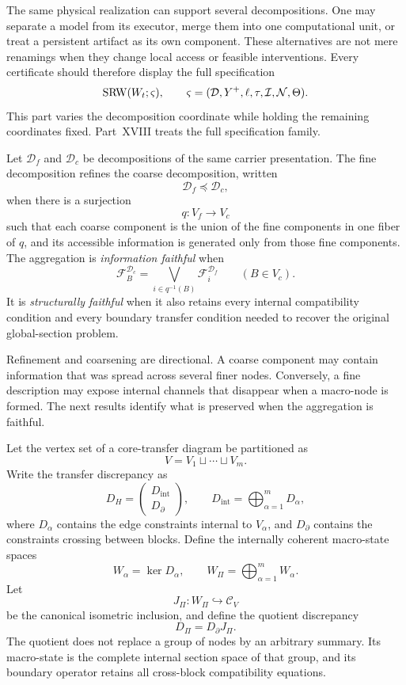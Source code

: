 The same physical realization can support several decompositions. One may
separate a model from its executor, merge them into one computational unit, or
treat a persistent artifact as its own component. These alternatives are not
mere renamings when they change local access or feasible interventions. Every certificate should therefore display the full specification
\[
\operatorname{SRW}(W_t;\varsigma),
\qquad
\varsigma=(\mathcal D,Y^+,\ell,\tau,\mathcal I,\mathcal N,\Theta).
\]
This part varies the decomposition coordinate while holding the remaining
coordinates fixed. Part~XVIII treats the full specification family.

\begin{definition}\label{def:decomposition-refinement}
Let \(\mathcal D_f\) and \(\mathcal D_c\) be decompositions of the same carrier
presentation. The fine decomposition refines the coarse decomposition,
written
\[
\mathcal D_f\preceq\mathcal D_c,
\]
when there is a surjection
\[
q:V_f\longrightarrow V_c
\]
such that each coarse component is the union of the fine components in one
fiber of \(q\), and its accessible information is generated only from those
fine components. The aggregation is \emph{information faithful} when
\[
\mathscr F_B^{\mathcal D_c}
=
\bigvee_{i\in q^{-1}(B)}
\mathscr F_i^{\mathcal D_f}
\qquad(B\in V_c).
\]
It is \emph{structurally faithful} when it also retains every internal
compatibility condition and every boundary transfer condition needed to
recover the original global-section problem.
\end{definition}

Refinement and coarsening are directional. A coarse component may contain
information that was spread across several finer nodes. Conversely, a fine
description may expose internal channels that disappear when a macro-node is
formed. The next results identify what is preserved when the aggregation is
faithful.


Let the vertex set of a core-transfer diagram be partitioned as
\[
V=V_1\sqcup\cdots\sqcup V_m.
\]
Write the transfer discrepancy as
\[
D_H
=
\begin{pmatrix}
D_{\mathrm{int}}\\
D_{\partial}
\end{pmatrix},
\qquad
D_{\mathrm{int}}
=
\bigoplus_{\alpha=1}^{m}D_\alpha,
\]
where \(D_\alpha\) contains the edge constraints internal to \(V_\alpha\),
and \(D_{\partial}\) contains the constraints crossing between blocks. Define
the internally coherent macro-state spaces
\[
W_\alpha=\ker D_\alpha,
\qquad
W_{\Pi}=\bigoplus_{\alpha=1}^{m}W_\alpha.
\]
Let
\[
J_\Pi:W_\Pi\hookrightarrow\mathcal C_V
\]
be the canonical isometric inclusion, and define the quotient discrepancy
\[
D_\Pi=D_{\partial}J_\Pi.
\]
The quotient does not replace a group of nodes by an arbitrary summary. Its
macro-state is the complete internal section space of that group, and its
boundary operator retains all cross-block compatibility equations.

